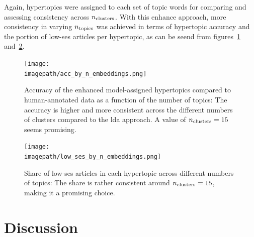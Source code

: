 Again, hypertopics were assigned to each set of topic words for comparing and assessing consistency across $n_\text{clusters}$. With this enhance approach, more consistency in varying $n_\text{topics}$ was achieved in terms of hypertopic accuracy and the portion of low-\gls{ses} articles per hypertopic, as can be seend from figures~\ref{fig:accuracy_by_nclusters} and~\ref{fig:lowshare_by_nclusters}.

\begin{figure}
    \centering
    \texttt{[image: \\imagepath/acc\_by\_n\_embeddings.png]}
    \caption{Accuracy of the  enhanced model-assigned hypertopics compared to human-annotated data as a function of the number of topics: The accuracy is higher and more consistent across the different numbers of clusters compared to the \gls{lda} approach. A value of $n_\text{clusters}=15$ seems promising.}\label{fig:accuracy_by_nclusters}
\end{figure}

\begin{figure}
    \centering
    \texttt{[image: \\imagepath/low\_ses\_by\_n\_embeddings.png]}
    \caption{Share of low-\gls{ses} articles in each hypertopic across different numbers of topics: The share is rather consistent around $n_\text{clusters}=15$, making it a promising choice.}\label{fig:lowshare_by_nclusters}
\end{figure}

\section{Discussion}